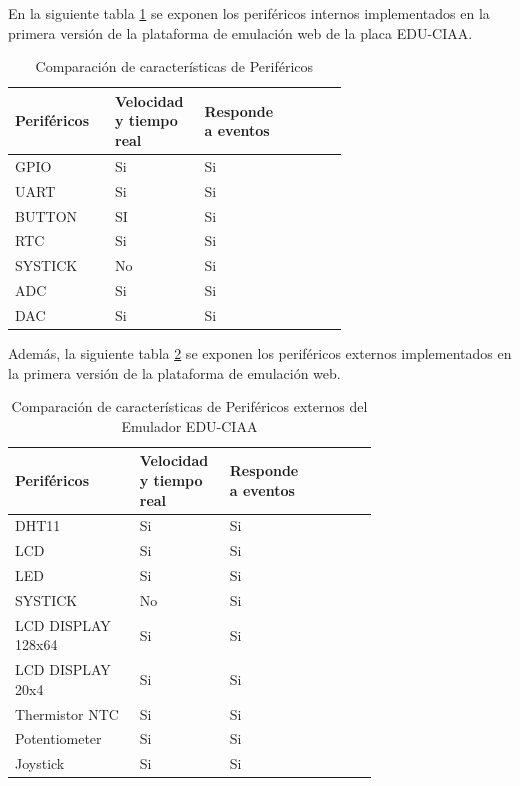 En la siguiente tabla \ref{tab:perifericosInternosCIAA} se exponen los  periféricos internos implementados en la primera versión de la plataforma de emulación web de la placa EDU-CIAA.

\begin{table}[h]
\centering
\caption[Comparación de características de periféricos internos del Emulador EDU-CIAA]{Comparación de características de Periféricos}
\begin{tabular}{p{0.24\linewidth} p{0.14\linewidth}  p{0.14\linewidth}  p{0.14\linewidth}}
\toprule
\textbf{Periféricos} 
& \textbf{Velocidad y tiempo real}
& \textbf{Responde a eventos}
\\
\midrule
GPIO & Si & Si  \\
UART & Si & Si \\
BUTTON & SI & Si \\
RTC & Si & Si  \\
SYSTICK & No & Si \\
ADC & Si & Si \\
DAC & Si & Si \\
\bottomrule
\hline
\end{tabular}
\label{tab:perifericosInternosCIAA}
\end{table}


Además, la siguiente tabla \ref{tab:perifericosExternosCIAA} se exponen los  periféricos externos implementados en la primera versión de la plataforma de emulación web.

\hfill \break
\hfill \break
\hfill \break
\hfill \break

\begin{table}[h]
\centering
\caption[Comparación de características de periféricos externos del Emulador EDU-CIAA]{Comparación de características de Periféricos externos del Emulador EDU-CIAA}
\begin{tabular}{p{0.30\linewidth} p{0.14\linewidth}  p{0.14\linewidth}  p{0.14\linewidth}}
\toprule
\textbf{Periféricos} 
& \textbf{Velocidad y tiempo real}
& \textbf{Responde a eventos}
\\
\midrule
DHT11 & Si & Si  \\
LCD & Si & Si  \\
LED & Si & Si  \\
SYSTICK & No & Si \\
LCD DISPLAY 128x64 & Si & Si \\
LCD DISPLAY 20x4 & Si & Si \\
Thermistor NTC & Si & Si \\
Potentiometer & Si & Si \\
Joystick & Si & Si \\
\bottomrule
\hline
\end{tabular}
\label{tab:perifericosExternosCIAA}
\end{table}


